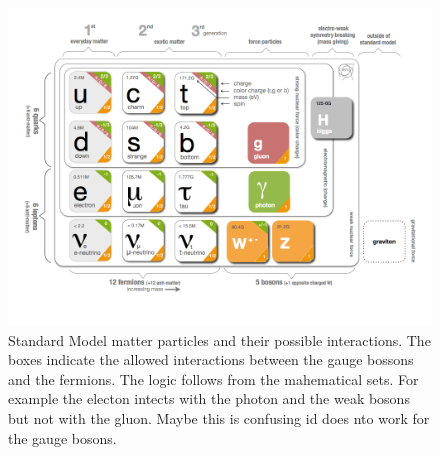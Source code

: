 \begin{figure}[h]
  \begin{center}
    \includegraphics[trim=1.4cm 0cm 5.95cm 0cm, clip=true, width=\textwidth]{Figures/Chapter1/Standard_model_infographic.png}
    \caption{Standard Model matter particles and their possible interactions. The boxes indicate the allowed interactions
             between the gauge bossons and the fermions. The logic follows from the mahematical sets. For example the electon
             intects with the photon and the weak bosons but not with the gluon. {\color{red} Maybe this is confusing id does nto work for the gauge bosons.}}
    \label{sm_particles}
  \end{center}
\end{figure}

